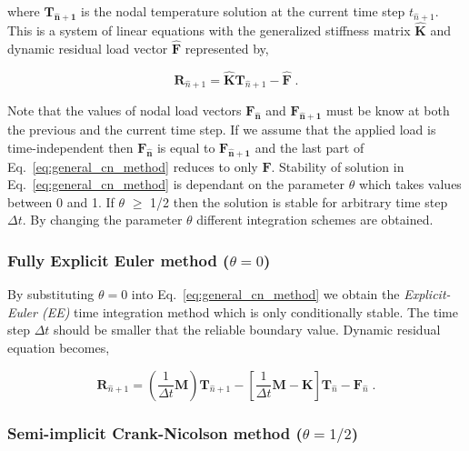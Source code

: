 \documentclass[10pt,a4paper]{article}
\begin{document}
where $\mathbf{{T}_{\hat{n} + 1}}$ is the nodal temperature solution at the current time step $t_{\hat{n} + 1}$. This is a system of linear equations with the generalized stiffness matrix $\mathbf{\hat{K}}$ and dynamic residual load vector $\mathbf{\hat{F}}$ represented by,

\begin{equation}
	\mathbf{R}_{\hat{n} + 1} = \mathbf{\hat{K}} \mathbf{T}_{\hat{n} + 1} - \mathbf{\hat{F}} \;.
	\label{eq:general_cn_method_compact}
\end{equation}

Note that the values of nodal load vectors $\mathbf{{F}_{\hat{n}}}$ and $\mathbf{{F}_{\hat{n} + 1}}$ must be know at both the previous and the current time step. If we assume that the applied load is time-independent then $\mathbf{{F}_{\hat{n}}}$ is equal to $\mathbf{{F}_{\hat{n} + 1}}$ and the last part of Eq.~\eqref{eq:general_cn_method} reduces to only $\mathbf{F}$. Stability of solution in Eq.~\eqref{eq:general_cn_method} is dependant on the parameter $\theta$ which takes values between 0 and 1. If $\theta$ $\geq$ 1/2 then the solution is stable for arbitrary time step  $\Delta t$. By changing the parameter $\theta$ different integration schemes are obtained.


\subsubsection{Fully Explicit Euler method ($\theta = 0$)} \label{subsubsec:time_discretization_ee}

By substituting $\theta = 0$ into Eq.~\eqref{eq:general_cn_method} we obtain the \textit{Explicit-Euler (EE)} time integration method which is only conditionally stable. The time step $\Delta t$ should be smaller that the reliable boundary value. Dynamic residual equation becomes,

\begin{equation}
	\mathbf{R}_{\hat{n} + 1} = \left( \frac{1}{\Delta t} \mathbf{M} \right)\mathbf{T}_{\hat{n} + 1} - \left[ \frac{1}{\Delta t} \mathbf{M} - \mathbf{K} \right]\mathbf{T}_{\hat{n}} - \mathbf{F}_{\hat{n}} \;. 
	\label{eq:timeDeriv_explicitEuler}
\end{equation}


\subsubsection{Semi-implicit Crank-Nicolson method ($\theta = 1/2$)} \label{subsec:time_discretization_cn}
\end{document}
